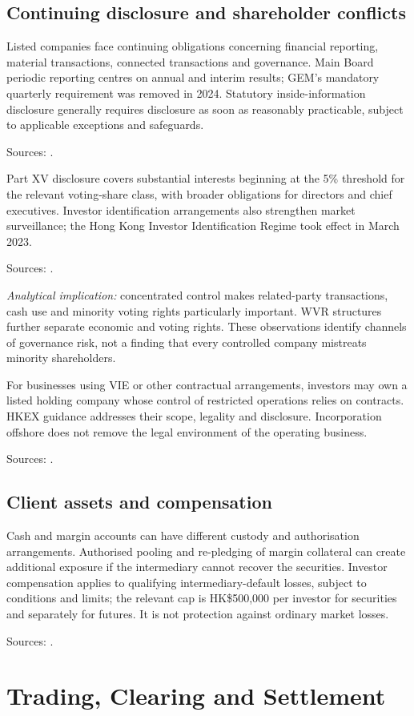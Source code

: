 \documentclass[11pt,a4paper]{article}
\newcommand{\source}[1]{\par{\footnotesize\color{ink}Sources: \cite{#1}.}\par}
\begin{document}
\subsection{Continuing disclosure and shareholder conflicts}
Listed companies face continuing obligations concerning financial reporting, material transactions, connected transactions and governance. Main Board periodic reporting centres on annual and interim results; GEM's mandatory quarterly requirement was removed in 2024. Statutory inside-information disclosure generally requires disclosure as soon as reasonably practicable, subject to applicable exceptions and safeguards.\source{ch13,gem,inside}

Part XV disclosure covers substantial interests beginning at the 5\% threshold for the relevant voting-share class, with broader obligations for directors and chief executives. Investor identification arrangements also strengthen market surveillance; the Hong Kong Investor Identification Regime took effect in March 2023.\source{interests,hkidr}

\textit{Analytical implication:} concentrated control makes related-party transactions, cash use and minority voting rights particularly important. WVR structures further separate economic and voting rights. These observations identify channels of governance risk, not a finding that every controlled company mistreats minority shareholders.

For businesses using VIE or other contractual arrangements, investors may own a listed holding company whose control of restricted operations relies on contracts. HKEX guidance addresses their scope, legality and disclosure. Incorporation offshore does not remove the legal environment of the operating business.\source{vie}

\subsection{Client assets and compensation}
Cash and margin accounts can have different custody and authorisation arrangements. Authorised pooling and re-pledging of margin collateral can create additional exposure if the intermediary cannot recover the securities. Investor compensation applies to qualifying intermediary-default losses, subject to conditions and limits; the relevant cap is HK\$500,000 per investor for securities and separately for futures. It is not protection against ordinary market losses.\source{ifecmargin,icf}

\section{Trading, Clearing and Settlement}
\end{document}
